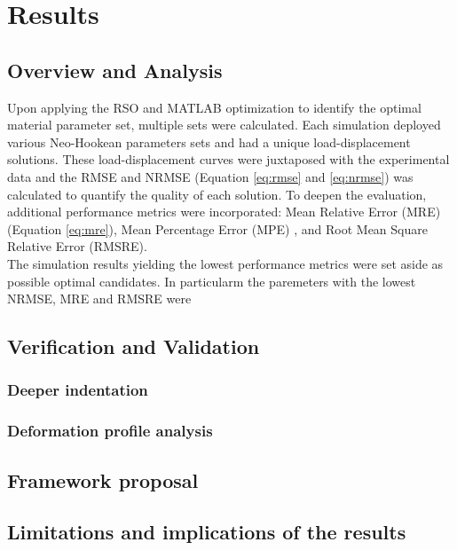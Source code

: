 
\chapter{Results} %
\label{resultschapter} %

\section{Overview and Analysis}
Upon applying the RSO and MATLAB optimization to identify the optimal material parameter set, 
multiple sets were calculated. 
Each simulation deployed various Neo-Hookean parameters sets and 
had a unique load-displacement solutions. These load-displacement curves were 
juxtaposed with the experimental data and the RMSE and NRMSE (Equation \ref{eq:rmse} and \ref{eq:nrmse}) was calculated to quantify the quality 
of each solution. To deepen the evaluation, additional performance metrics were incorporated: 
Mean Relative Error (MRE) (Equation \ref{eq:mre}), Mean Percentage Error (MPE)
, and Root Mean Square Relative Error (RMSRE).\\

The simulation results yielding the lowest performance metrics were set aside as possible
optimal candidates. In particularm the paremeters with the lowest NRMSE, MRE and RMSRE were 


\section{Verification and Validation}

\subsection{Deeper indentation}

\subsection{Deformation profile analysis}

\section{Framework proposal}

\section{Limitations and implications of the results}




